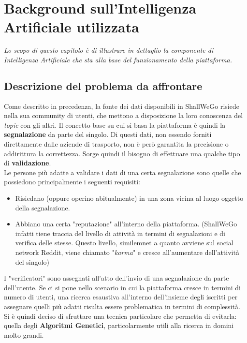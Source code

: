 \chapter{Background sull'Intelligenza Artificiale utilizzata} %
%

\begin{citazione}
    \textit{Lo scopo di questo capitolo è di illustrare in dettaglio la componente di Intelligenza Artificiale che sta alla base del funzionamento della piattaforma.}
\end{citazione}

\newpage

\section{Descrizione del problema da affrontare}
    Come descritto in precedenza, la fonte dei dati disponibili in ShallWeGo risiede nella sua community di utenti, che mettono a disposizione la loro conoscenza del \textit{topic} con gli altri. Il concetto base su cui si basa la piattaforma è quindi la \textbf{segnalazione} da parte del singolo. Di questi dati, non essendo forniti direttamente dalle aziende di trasporto, non è però garantita la precisione o addirittura la correttezza. Sorge quindi il bisogno di effettuare una qualche tipo di \textbf{validazione}. \\
    Le persone più adatte a validare i dati di una certa segnalazione sono quelle che possiedono principalmente i seguenti requisiti:
    \begin{itemize}
        \item Risiedano (oppure operino abitualmente) in una zona vicina al luogo oggetto della segnalazione.
        \item Abbiano una certa "reputazione" all'interno della piattaforma. (ShallWeGo infatti tiene traccia del livello di attività in termini di segnalazioni e di verifica delle stesse. Questo livello, similemnet a quanto avviene sul social network Reddit, viene chiamato "\textit{karma}" e cresce all'aumentare dell'attività del singolo)
    \end{itemize}

    I "verificatori" sono assegnati all'atto dell'invio di una segnalazione da parte dell'utente. 
    Se ci si pone nello scenario in cui la piattaforma cresce in termini di numero di utenti, una ricerca esaustiva all'interno dell'insieme degli iscritti per assegnare quelli più adatti risulta essere problematica in termini di complessità. Si è quindi deciso di sfruttare una tecnica particolare che permetta di evitarla: quella degli \textbf{Algoritmi Genetici}, particolarmente utili alla ricerca in domini molto grandi.

